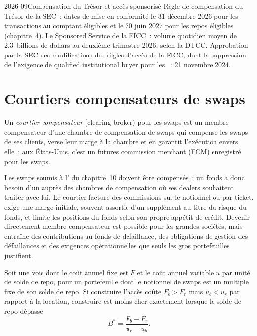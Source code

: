 \begin{dated}{2026-09}{Compensation du Trésor et accès sponsorisé}\label{dat:m2:getting-access-rates-credit:access}
Règle de compensation du Trésor de la SEC~: dates de mise en conformité le 31 décembre 2026 pour les
transactions au comptant éligibles et le 30 juin 2027 pour les repos éligibles (chapitre~4). Le Sponsored Service de la FICC~:
volume quotidien moyen de 2.3~billions de dollars au deuxième trimestre 2026, selon la DTCC. Approbation par la
SEC des modifications des règles d'accès de la FICC, dont la suppression de l'exigence
de qualified institutional buyer pour les ~: 21 novembre 2024.
\end{dated}

\section{Courtiers compensateurs de swaps}

\begin{definition}\label{def:m2:getting-access-rates-credit:cb}
Un \emph{courtier compensateur} (clearing broker) pour les swaps est un membre compensateur
d'une chambre de compensation de swaps qui compense les swaps de ses clients, verse leur marge à la
chambre et en garantit l'exécution envers elle~; aux États-Unis, c'est un
futures commission merchant (FCM) enregistré pour les swaps.
\end{definition}

Les swaps soumis à l' du chapitre~10 doivent être compensés~; un fonds a donc besoin
d'un  auprès des chambres de compensation où ses dealers souhaitent traiter avec lui. Le courtier
facture des commissions sur le notionnel ou par ticket, exige une marge initiale, souvent assortie
d'un supplément au titre du risque du fonds, et limite les positions du fonds selon son propre
appétit de crédit. Devenir directement membre compensateur est possible pour les grandes sociétés, mais
entraîne des contributions au fonds de défaillance, des obligations de gestion des défaillances et des
exigences opérationnelles que seuls les gros portefeuilles justifient.

\begin{proposition}\label{prop:m2:getting-access-rates-credit:breakeven}
Soit une voie dont le coût annuel fixe est $F$ et le coût annuel variable $u$ par unité de
solde de repo, pour un portefeuille dont le notionnel de swaps est un multiple fixe de son solde de repo. Si
construire l'accès coûte $F_b > F_r$ mais $u_b < u_r$ par rapport à la location, construire est
moins cher exactement lorsque le solde de repo dépasse
\[
B^* = \frac{F_b - F_r}{u_r - u_b}.
\]
\end{proposition}

